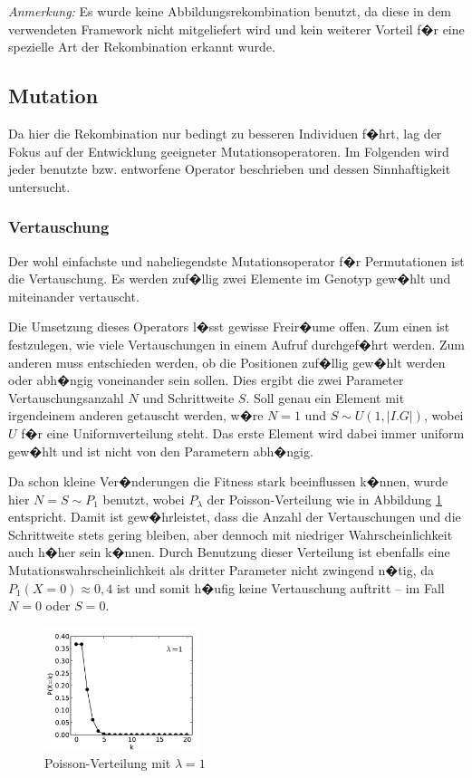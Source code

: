 \documentclass[a4paper,abstracton,12pt]{scrartcl}
\begin{document}
\emph{Anmerkung:} Es wurde keine Abbildungsrekombination benutzt, da diese in dem verwendeten Framework nicht mitgeliefert wird und kein weiterer Vorteil f�r eine spezielle Art der Rekombination erkannt wurde.

\subsection{Mutation}

Da hier die Rekombination nur bedingt zu besseren Individuen f�hrt, lag der Fokus auf der Entwicklung geeigneter Mutationsoperatoren. Im Folgenden wird jeder benutzte bzw. entworfene Operator beschrieben und dessen Sinnhaftigkeit untersucht.

\subsubsection{Vertauschung}

Der wohl einfachste und naheliegendste Mutationsoperator f�r Permutationen ist die Vertauschung. Es werden zuf�llig zwei Elemente im Genotyp gew�hlt und miteinander vertauscht.

Die Umsetzung dieses Operators l�sst gewisse Freir�ume offen. Zum einen ist festzulegen, wie viele Vertauschungen in einem Aufruf durchgef�hrt werden. Zum anderen muss entschieden werden, ob die Positionen zuf�llig gew�hlt werden oder abh�ngig voneinander sein sollen. Dies ergibt die zwei Parameter Vertauschungsanzahl $N$ und Schrittweite $S$. Soll genau ein Element mit irgendeinem anderen getauscht werden, w�re $N=1$ und $S \sim U(1,|I.G|)$, wobei $U$ f�r eine Uniformverteilung steht. Das erste Element wird dabei immer uniform gew�hlt und ist nicht von den Parametern abh�ngig.

Da schon kleine Ver�nderungen die Fitness stark beeinflussen k�nnen, wurde hier $N = S \sim P_1$ benutzt, wobei $P_\lambda$ der Poisson-Verteilung wie in Abbildung \ref{fig:poisson1} entspricht. Damit ist gew�hrleistet, dass die Anzahl der Vertauschungen und die Schrittweite stets gering bleiben, aber dennoch mit niedriger Wahrscheinlichkeit auch h�her sein k�nnen. Durch Benutzung dieser Verteilung ist ebenfalls eine Mutationswahrscheinlichkeit als dritter Parameter nicht zwingend n�tig, da $P_1(X=0) \approx 0,4$ ist und somit h�ufig keine Vertauschung auftritt -- im Fall $N=0$ oder $S=0$.

\begin{figure}
	\centering
		\includegraphics[width=0.4\textwidth]{imgs/poisson1.pdf}
	\caption{Poisson-Verteilung mit $\lambda = 1$}
	\label{fig:poisson1}
\end{figure}
\end{document}

